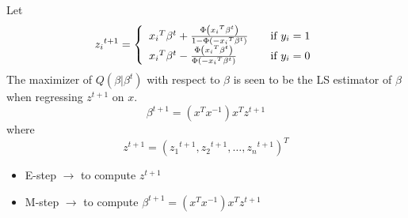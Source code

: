 \documentclass[a4paper]{article}
\begin{document}
Let 
\[ {z_i}^{t+1} = \left\{ 
  \begin{array}{l l}
    {x_i}^T\beta^{t} + \frac{\Phi\left({x_i}^T\beta^t\right)}{1 -\Phi\left(-{x_i}^T\beta^t\right) }  & \quad\text{if $y_i = 1$}\\
     {x_i}^T\beta^{t} - \frac{\Phi\left({x_i}^T\beta^t\right)}{\Phi\left(-{x_i}^T\beta^t\right) }  & \quad \text{if $y_i = 0$}\\
  \end{array} \right.\] 
The maximizer of $Q(\beta \vert \beta^t) $ with respect to $\beta$ is seen to be the LS estimator of $\beta$ when regressing $z^{t+1}$ on $x$. \\
  \begin{equation} 
\beta^{t+1} = (x^Tx^{-1})x^Tz^{t+1}
\end{equation}
where \\
 \begin{equation} 
 z^{t+1} = ({z_1}^{t+1},{z_2}^{t+1},\dotsc,{z_n}^{t+1})^T
\end{equation}
\begin{itemize}
\item E-step $\rightarrow$ to compute $z^{t+1}$
\item M-step $\rightarrow$ to compute $\beta^{t+1} = (x^Tx^{-1})x^Tz^{t+1}$
\end{itemize}
\end{document}
